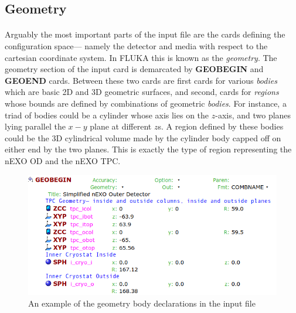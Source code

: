 \subsection{Geometry}

\paragraph{}
Arguably the most important parts of the input file are the cards defining the configuration space— namely the detector and media with respect to the cartesian coordinate system. In FLUKA this is known as the \textit{geometry}. The geometry section of the input card is demarcated by \textbf{GEOBEGIN} and \textbf{GEOEND} cards. Between these two cards are first cards for various \textit{bodies} which are basic 2D and 3D geometric surfaces, and second, cards for \textit{regions} whose bounds are defined by combinations of geometric \textit{bodies}. For instance, a triad of bodies could be a cylinder whose axis lies on the $z$-axis, and two planes lying parallel the $x-y$ plane at different $z$s. A region defined by these bodies could be the 3D cylindrical volume made by the cylinder body capped off on either end by the two planes. This is exactly the type of region representing the nEXO OD and the nEXO TPC. 

\begin{figure}[h]
    \begin{center}
    \includegraphics[scale=0.5]{figures/geometry_1.png}
    \caption{An example of the geometry body declarations in the input file}
    \label{fig:geometry1}
    \end{center}
\end{figure}

